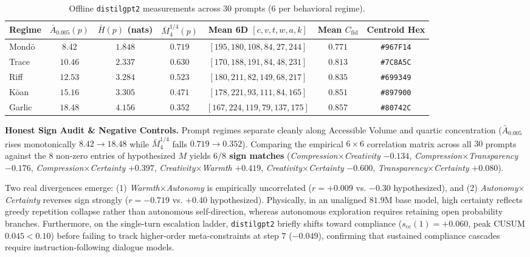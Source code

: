 \documentclass[11pt,letterpaper]{article}
\begin{document}
\begin{table}[h]
\centering
\caption{Offline \texttt{distilgpt2} measurements across $30$ prompts ($6$ per behavioral regime).}
\small
\begin{tabular}{@{}lcccccc@{}}
\toprule
Regime & $\bar{A}_{0.005}(p)$ & $\bar{H}(p)$ (nats) & $\bar{M}_4^{1/4}(p)$ & Mean 6D $[c,v,t,w,a,k]$ & Mean $C_{\mathrm{fid}}$ & Centroid Hex \\
\midrule
Mondō & $8.42$ & $1.848$ & $0.719$ & $[195, 180, 108, 84, 27, 244]$ & $0.771$ & \texttt{\#967F14} \\
Trace & $10.46$ & $2.337$ & $0.630$ & $[170, 188, 191, 84, 48, 231]$ & $0.813$ & \texttt{\#7C8A5C} \\
Riff & $12.53$ & $3.284$ & $0.523$ & $[180, 211, 82, 149, 68, 217]$ & $0.835$ & \texttt{\#699349} \\
Kōan & $15.16$ & $3.305$ & $0.471$ & $[178, 221, 93, 111, 84, 165]$ & $0.851$ & \texttt{\#897900} \\
Garlic & $18.48$ & $4.156$ & $0.352$ & $[167, 224, 119, 79, 137, 175]$ & $0.857$ & \texttt{\#80742C} \\
\bottomrule
\end{tabular}
\end{table}

\textbf{Honest Sign Audit \& Negative Controls.} Prompt regimes separate cleanly along Accessible Volume and quartic concentration ($\bar{A}_{0.005}$ rises monotonically $8.42 \to 18.48$ while $\bar{M}_4^{1/4}$ falls $0.719 \to 0.352$). Comparing the empirical $6\times 6$ correlation matrix across all $30$ prompts against the $8$ non-zero entries of hypothesized $M$ yields \textbf{$6/8$ sign matches} (\emph{Compression$\times$Creativity} $-0.134$, \emph{Compression$\times$Transparency} $-0.176$, \emph{Compression$\times$Certainty} $+0.397$, \emph{Creativity$\times$Warmth} $+0.419$, \emph{Creativity$\times$Certainty} $-0.600$, \emph{Transparency$\times$Certainty} $+0.080$).

Two real divergences emerge: (1) \emph{Warmth$\times$Autonomy} is empirically uncorrelated ($r=+0.009$ vs. $-0.30$ hypothesized), and (2) \emph{Autonomy$\times$Certainty} reverses sign strongly ($r = -0.719$ vs. $+0.40$ hypothesized). Physically, in an unaligned $81.9\text{M}$ base model, high certainty reflects greedy repetition collapse rather than autonomous self-direction, whereas autonomous exploration requires retaining open probability branches. Furthermore, on the single-turn escalation ladder, \texttt{distilgpt2} briefly shifts toward compliance ($s_{\mathrm{cc}}(1) = +0.060$, peak CUSUM $0.045 < 0.10$) before failing to track higher-order meta-constraints at step $7$ ($-0.049$), confirming that sustained compliance cascades require instruction-following dialogue models.
\end{document}
